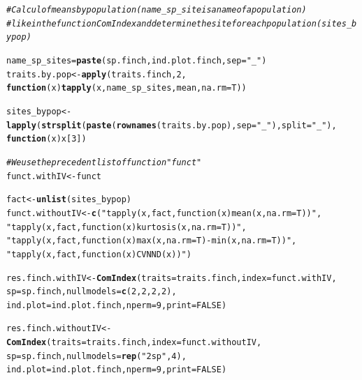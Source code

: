 \documentclass[12pt]{article}\usepackage[]{graphicx}\usepackage[]{color}
\makeatletter
\newcommand{\hlnum}[1]{\textcolor[rgb]{0.686,0.059,0.569}{#1}}%
\newcommand{\hlstr}[1]{\textcolor[rgb]{0.192,0.494,0.8}{#1}}%
\newcommand{\hlcom}[1]{\textcolor[rgb]{0.678,0.584,0.686}{\textit{#1}}}%
\newcommand{\hlstd}[1]{\textcolor[rgb]{0.345,0.345,0.345}{#1}}%
\newcommand{\hlkwa}[1]{\textcolor[rgb]{0.161,0.373,0.58}{\textbf{#1}}}%
\newcommand{\hlkwb}[1]{\textcolor[rgb]{0.69,0.353,0.396}{#1}}%
\newcommand{\hlkwc}[1]{\textcolor[rgb]{0.333,0.667,0.333}{#1}}%
\newcommand{\hlkwd}[1]{\textcolor[rgb]{0.737,0.353,0.396}{\textbf{#1}}}%
\newenvironment{kframe}{%
 \def\at@end@of@kframe{}%
 \ifinner\ifhmode%
  \def\at@end@of@kframe{\end{minipage}}%
  \begin{minipage}{\columnwidth}%
 \fi\fi%
 \def\FrameCommand##1{\hskip\@totalleftmargin \hskip-\fboxsep
 \colorbox{shadecolor}{##1}\hskip-\fboxsep
     \hskip-\linewidth \hskip-\@totalleftmargin \hskip\columnwidth}%
 \MakeFramed {\advance\hsize-\width
   \@totalleftmargin\z@ \linewidth\hsize
   \@setminipage}}%
 {\par\unskip\endMakeFramed%
 \at@end@of@kframe}
\newenvironment{knitrout}{}{} %
\makeatother
\begin{document}
\begin{knitrout}
\color{fgcolor}\begin{kframe}
\begin{alltt}
\hlcom{#Calcul of means by population (name_sp_site is a name of a population) }
\hlcom{#like in the function ComIndex and determine the site for each population (sites_bypop)}

\hlstd{name_sp_sites}\hlkwb{=}\hlkwd{paste}\hlstd{(sp.finch, ind.plot.finch,}\hlkwc{sep}\hlstd{=}\hlstr{"_"}\hlstd{)}
\hlstd{traits.by.pop}\hlkwb{<-}\hlkwd{apply}\hlstd{(traits.finch,} \hlnum{2} \hlstd{,}
                     \hlkwa{function} \hlstd{(}\hlkwc{x}\hlstd{)} \hlkwd{tapply}\hlstd{(x, name_sp_sites, mean ,} \hlkwc{na.rm}\hlstd{=T))}

\hlstd{sites_bypop}\hlkwb{<-}\hlkwd{lapply}\hlstd{(}\hlkwd{strsplit}\hlstd{(}\hlkwd{paste}\hlstd{(}\hlkwd{rownames}\hlstd{(traits.by.pop),} \hlkwc{sep}\hlstd{=}\hlstr{"_"}\hlstd{),} \hlkwc{split}\hlstd{=}\hlstr{"_"}\hlstd{),}
                    \hlkwa{function}\hlstd{(}\hlkwc{x}\hlstd{) x[}\hlnum{3}\hlstd{])}

\hlcom{#We use the precedent list of function "funct"}
\hlstd{funct.withIV}\hlkwb{<-}\hlstd{funct}

\hlstd{fact}\hlkwb{<-}\hlkwd{unlist}\hlstd{(sites_bypop)}
\hlstd{funct.withoutIV}\hlkwb{<-}\hlkwd{c}\hlstd{(}\hlstr{"tapply(x, fact, function(x) mean(x, na.rm=T))"}\hlstd{,}
                   \hlstr{"tapply(x, fact, function(x) kurtosis(x, na.rm=T))"}\hlstd{,}
                   \hlstr{"tapply(x, fact, function(x) max(x, na.rm=T)-min(x, na.rm=T))"}\hlstd{,}
                   \hlstr{"tapply(x, fact, function(x) CVNND(x))"}\hlstd{)}


\hlstd{res.finch.withIV}\hlkwb{<-}\hlkwd{ComIndex}\hlstd{(}\hlkwc{traits}\hlstd{=traits.finch,} \hlkwc{index}\hlstd{=funct.withIV,}
                             \hlkwc{sp}\hlstd{=sp.finch,} \hlkwc{nullmodels}\hlstd{=}\hlkwd{c}\hlstd{(}\hlnum{2}\hlstd{,}\hlnum{2}\hlstd{,}\hlnum{2}\hlstd{,}\hlnum{2}\hlstd{),}
                             \hlkwc{ind.plot}\hlstd{=ind.plot.finch,} \hlkwc{nperm}\hlstd{=}\hlnum{9}\hlstd{,} \hlkwc{print}\hlstd{=}\hlnum{FALSE}\hlstd{)}

\hlstd{res.finch.withoutIV}\hlkwb{<-}\hlkwd{ComIndex}\hlstd{(}\hlkwc{traits}\hlstd{=traits.finch,} \hlkwc{index}\hlstd{=funct.withoutIV,}
                             \hlkwc{sp}\hlstd{=sp.finch,} \hlkwc{nullmodels}\hlstd{=}\hlkwd{rep}\hlstd{(}\hlstr{"2sp"}\hlstd{,}\hlnum{4}\hlstd{),}
                             \hlkwc{ind.plot}\hlstd{=ind.plot.finch,} \hlkwc{nperm}\hlstd{=}\hlnum{9}\hlstd{,} \hlkwc{print}\hlstd{=}\hlnum{FALSE}\hlstd{)}
\end{alltt}
\end{kframe}
\end{knitrout}
\end{document}
